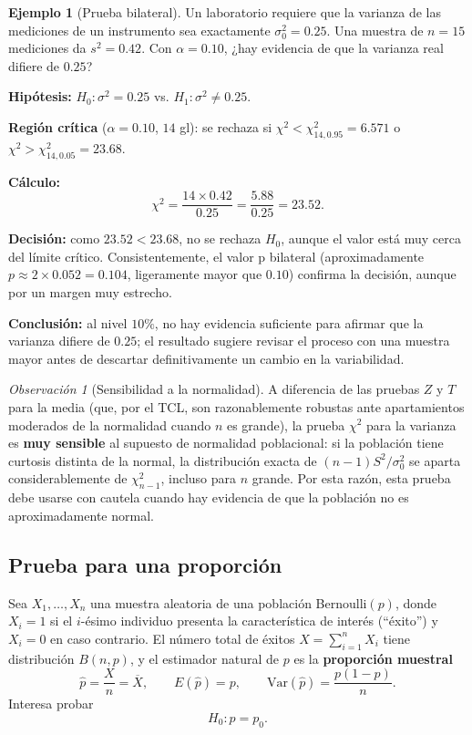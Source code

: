 \documentclass[11pt,a4paper]{article}
\theoremstyle{plain}
\theoremstyle{definition}
\newtheorem{ejemplo}[teorema]{Ejemplo}
\theoremstyle{remark}
\newtheorem{observacion}[teorema]{Observación}
\begin{document}
\begin{ejemplo}[Prueba bilateral]
Un laboratorio requiere que la varianza de las mediciones de un instrumento sea exactamente $\sigma_0^2=0.25$. Una muestra de $n=15$ mediciones da $s^2=0.42$. Con $\alpha=0.10$, ¿hay evidencia de que la varianza real difiere de $0.25$?

\textbf{Hipótesis:} $H_0:\sigma^2=0.25$ vs. $H_1:\sigma^2\neq0.25$.

\textbf{Región crítica} ($\alpha=0.10$, $14$ gl): se rechaza si $\chi^2<\chi^2_{14,0.95}=6.571$ o $\chi^2>\chi^2_{14,0.05}=23.68$.

\textbf{Cálculo:}
\[
\chi^2=\frac{14\times0.42}{0.25}=\frac{5.88}{0.25}=23.52.
\]

\textbf{Decisión:} como $23.52<23.68$, no se rechaza $H_0$, aunque el valor está muy cerca del límite crítico. Consistentemente, el valor p bilateral (aproximadamente $p\approx2\times0.052=0.104$, ligeramente mayor que $0.10$) confirma la decisión, aunque por un margen muy estrecho.

\textbf{Conclusión:} al nivel $10\%$, no hay evidencia suficiente para afirmar que la varianza difiere de $0.25$; el resultado sugiere revisar el proceso con una muestra mayor antes de descartar definitivamente un cambio en la variabilidad.
\end{ejemplo}

\begin{observacion}[Sensibilidad a la normalidad]
A diferencia de las pruebas $Z$ y $T$ para la media (que, por el TCL, son razonablemente robustas ante apartamientos moderados de la normalidad cuando $n$ es grande), la prueba $\chi^2$ para la varianza es \textbf{muy sensible} al supuesto de normalidad poblacional: si la población tiene curtosis distinta de la normal, la distribución exacta de $(n-1)S^2/\sigma_0^2$ se aparta considerablemente de $\chi^2_{n-1}$, incluso para $n$ grande. Por esta razón, esta prueba debe usarse con cautela cuando hay evidencia de que la población no es aproximadamente normal.
\end{observacion}

\subsection{Prueba para una proporción}

Sea $X_1,\dots,X_n$ una muestra aleatoria de una población Bernoulli$(p)$, donde $X_i=1$ si el $i$-ésimo individuo presenta la característica de interés (``éxito'') y $X_i=0$ en caso contrario. El número total de éxitos $X=\sum_{i=1}^n X_i$ tiene distribución $B(n,p)$, y el estimador natural de $p$ es la \textbf{proporción muestral}
\[
\hat p=\frac{X}{n}=\overline X, \qquad E(\hat p)=p, \qquad \text{Var}(\hat p)=\frac{p(1-p)}{n}.
\]
Interesa probar
\[
H_0:p=p_0.
\]
\end{document}
